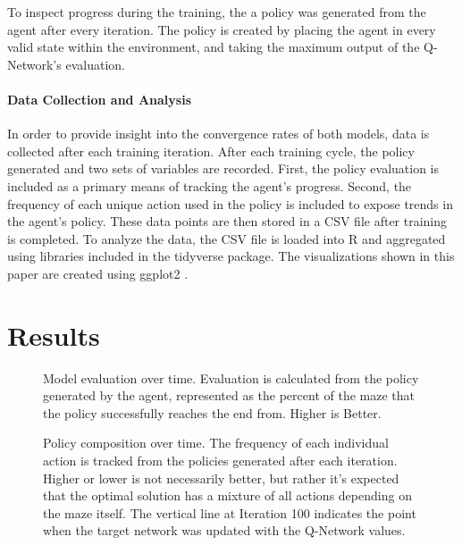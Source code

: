 \documentclass[12pt,letterpaper]{article}
\begin{document}
To inspect progress during the training, the a policy was generated from the agent after every iteration.
The policy is created by placing the agent in every valid state within the environment, and taking the maximum output of the Q-Network's evaluation.


\paragraph{Data Collection and Analysis}

In order to provide insight into the convergence rates of both models, data is collected after each training iteration.
After each training cycle, the policy generated and two sets of variables are recorded.
First, the policy evaluation is included as a primary means of tracking the agent's progress.
Second, the frequency of each unique action used in the policy is included to expose trends in the agent's policy.
These data points are then stored in a CSV file after training is completed.
To analyze the data, the CSV file is loaded into R \cite{lang_r} and aggregated using libraries included in the tidyverse \cite{lib_tidyverse} package.
The visualizations shown in this paper are created using ggplot2 \cite{lib_ggplot2}.

\section{Results}

\begin{figure}[h]
	\begin{center}
		
	\end{center}
	\caption{Model evaluation over time. Evaluation is calculated from the policy generated by the agent, represented as the percent of the maze that the policy successfully reaches the end from. Higher is Better.}
	\label{fig:evaluation}
\end{figure}

\begin{figure}[h]
	\begin{center}
		
	\end{center}
	\caption{Policy composition over time. The frequency of each individual action is tracked from the policies generated after each iteration. Higher or lower is not necessarily better, but rather it's expected that the optimal solution has a mixture of all actions depending on the maze itself. The vertical line at Iteration 100 indicates the point when the target network was updated with the Q-Network values.}
	\label{fig:directional}
\end{figure}
\end{document}
